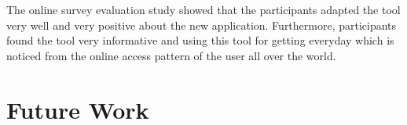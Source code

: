 The online survey evaluation study showed that the participants adapted the tool very well and very positive about the new application. Furthermore, participants found the tool very informative and using this tool for getting everyday which is noticed from the online access pattern of the user all over the world.  

\section*{Future Work}


